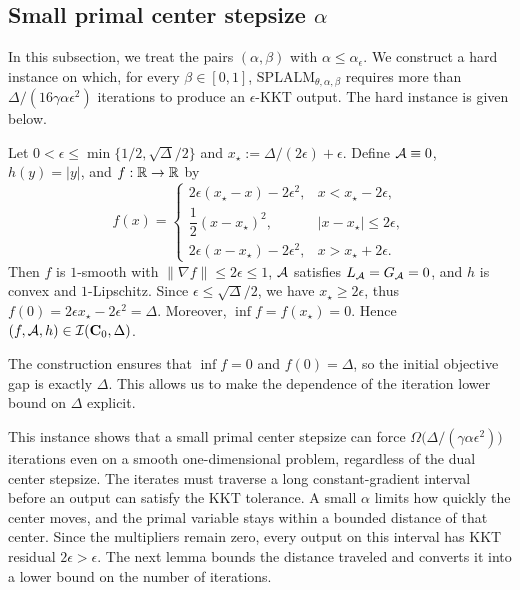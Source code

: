 \subsection{Small primal center stepsize $\alpha$}
\label{subsec:lb-plateau}

In this subsection, we treat the pairs \((\alpha,\beta)\) with
\(\alpha\le\alpha_\epsilon\). We construct a hard instance on which, for
every \(\beta\in[0,1]\), \(\mathrm{SPLALM}_{\theta,\alpha,\beta}\) requires
more than \(\Delta/(16\gamma\alpha\epsilon^2)\) iterations to produce an
\(\epsilon\)-KKT output. The hard instance is given below.

\begin{example}
\label{ex:plateau}
Let \(0<\epsilon\le\min\{1/2,\sqrt{\Delta}/2\}\) and
\(x_\star:=\Delta/(2\epsilon)+\epsilon\). Define \(\mathcal{A}\equiv0\),
\(h(y)=|y|\), and \(f:\mathbb{R}\to\mathbb{R}\) by
\[
f(x)=
\begin{cases}
2\epsilon(x_\star-x)-2\epsilon^2, & x<x_\star-2\epsilon,\\[4pt]
\dfrac12(x-x_\star)^2, & |x-x_\star|\le2\epsilon,\\[4pt]
2\epsilon(x-x_\star)-2\epsilon^2, & x>x_\star+2\epsilon.
\end{cases}
\]
Then \(f\) is \(1\)-smooth with \(\|\nabla f\|\le2\epsilon\le1\), \(\mathcal{A}\) satisfies
\(L_{\mathcal{A}}=G_{\mathcal{A}}=0\), and \(h\) is convex and \(1\)-Lipschitz. Since
\(\epsilon\le\sqrt{\Delta}/2\), we have \(x_\star\ge2\epsilon\), thus \(f(0)=2\epsilon x_\star-2\epsilon^2=\Delta\). Moreover, \(\inf f=f(x_\star)=0\). Hence
\((f,\mathcal{A},h)\in\mathcal I(\mathbf C_0,\Delta)\).
\end{example}

\begin{remark}
\label{rem:plateau}
The construction ensures that \(\inf f=0\) and \(f(0)=\Delta\), so the
initial objective gap is exactly \(\Delta\). This allows us to make the
dependence of the iteration lower bound on \(\Delta\) explicit.
\end{remark}

This instance shows that a small primal center stepsize can force
\(\Omega\bigl(\Delta/(\gamma\alpha\epsilon^2)\bigr)\) iterations even on a
smooth one-dimensional problem, regardless of the dual center stepsize.
The iterates must traverse a long constant-gradient interval before an
output can satisfy the KKT tolerance. A small \(\alpha\) limits how quickly
the center moves, and the primal variable stays within a bounded distance
of that center. Since the multipliers remain zero, every output on this
interval has KKT residual \(2\epsilon>\epsilon\). The next lemma bounds the
distance traveled and converts it into a lower bound on the number of
iterations.


